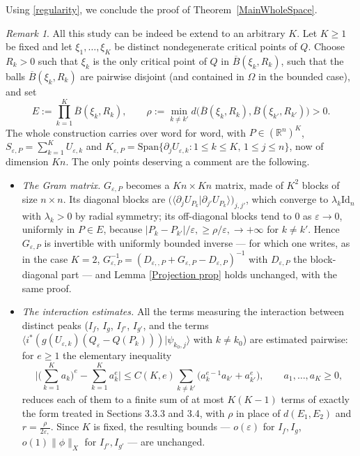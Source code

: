 \documentclass[12pt]{amsart}
\theoremstyle{plain}
\theoremstyle{definition}
\theoremstyle{remark}
\newtheorem{remark}[theorem]{Remark}
\renewcommand{\epsilon}{\varepsilon}
\begin{document}
Using \ref{regularity}, we conclude the proof of Theorem~\ref{MainWholeSpace}.
\medskip
\begin{remark}
 All this study can be indeed be extend to an arbitrary $K$.
Let $K\ge1$ be fixed and let $\xi_1,\dots,\xi_K$ be distinct nondegenerate
critical points of $Q$. Choose $R_k>0$ such that $\xi_k$ is the only critical
point of $Q$ in $\overline B(\xi_k,R_k)$, such that the balls
$\overline B(\xi_k,R_k)$ are pairwise disjoint (and contained in $\Omega$ in
the bounded case), and set
\[
E:=\prod_{k=1}^{K}\overline B(\xi_k,R_k),
\qquad
\rho:=\min_{k\ne k'}d\big(\overline B(\xi_k,R_k),\overline B(\xi_{k'},R_{k'})\big)>0 .
\]
The whole construction carries over word for word, with $P\in(\mathbb{R}^n)^K$,
$S_{\epsilon,P}=\sum_{k=1}^{K}U_{\epsilon,k}$ and
$K_{\epsilon,P}=\mathrm{Span}\{\partial_jU_{\epsilon,k}:1\le k\le K,\,1\le j\le n\}$,
now of dimension $Kn$. The only points deserving a comment are the following.
\begin{itemize}
\item[(a)] \emph{The Gram matrix.} $G_{\epsilon,P}$ becomes a $Kn\times Kn$ matrix,
made of $K^2$ blocks of size $n\times n$. Its diagonal blocks are
$\big(\langle\partial_jU_{P_k}|\partial_{j'}U_{P_k}\rangle\big)_{j,j'}$, which
converge to $\lambda_k\mathrm{Id}_n$ with $\lambda_k>0$ by radial symmetry;
its off-diagonal blocks tend to $0$ as $\epsilon\to0$, uniformly in $P\in E$,
because $|P_k-P_{k'}|/\epsilon,\ge\rho/\epsilon,\to+\infty$ for $k\ne k'$. Hence $G_{\epsilon,P}$ is invertible with
uniformly bounded inverse --- for which one writes, as in the case $K=2$,
$G_{\epsilon,P}^{-1}=(D_{\epsilon,,P}+G_{\epsilon,P}-D_{\epsilon,P})^{-1}$ with $D_{\epsilon,P}$ the
block-diagonal part --- and Lemma \ref{Projection prop} holds unchanged, with the same proof.
 
\item[(b)] \emph{The interaction estimates.} All the terms measuring the
interaction between distinct peaks ($I_f$, $I_g$, $I_{f'}$, $I_{g'}$, and the
terms $\langle i^*(g(U_{\epsilon,k})(Q_\epsilon-Q(P_k)))|\psi_{k_0,j}\rangle$ with
$k\ne k_0$) are estimated pairwise: for $e\ge1$ the elementary inequality
\[
\Big|\Big(\sum_{k=1}^{K}a_k\Big)^{e}-\sum_{k=1}^{K}a_k^{e}\Big|
\le C(K,e)\sum_{k\ne k'}\big(a_k^{e-1}a_{k'}+a_{k'}^{e}\big),
\qquad a_1,\dots,a_K\ge0,
\]
reduces each of them to a finite sum of at most $K(K-1)$ terms of exactly the
form treated in Sections 3.3.3 and 3.4, with $\rho$ in place of
$d(E_1,E_2)$ and $r=\frac{\rho}{2\epsilon,}$. Since $K$ is fixed, the resulting
bounds --- $o(\epsilon)$ for $I_f,I_g$, $o(1)\|\phi\|_X$ for $I_{f'},I_{g'}$ --- are
unchanged.
 

\end{itemize}
\end{remark}
\end{document}
